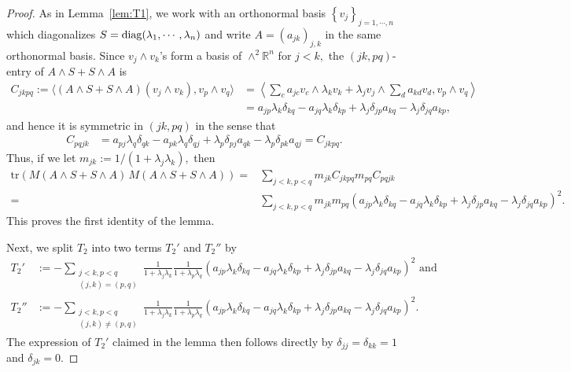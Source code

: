 \documentclass[11pt]{amsart}
\numberwithin{equation}{section}
\theoremstyle{definition}
\theoremstyle{definition}
\newcommand{\pair}[1]{\langle #1\rangle}
\newcommand{\set}[1]{\left\{#1\right\}}
\newcommand{\ppair}[1]{\left\langle #1\right\rangle}
\newcommand{\pr}[1]{\left(#1\right)}
\newcommand{\bb}[1]{\mathbb{#1}} \newcommand{\td}[1]{\widetilde{#1}}
\newcommand{\tr}{\text{tr}}
\begin{document}
\begin{proof}
	As in Lemma~\ref{lem:T1}, we work with an orthonormal basis $\set{v_j}_{j=1,\cdots,n}$ which diagonalizes $S={\rm diag}(\lambda_1,\cdots,\lambda_n)$ and write $A=(a_{jk})_{j,k}$ in the same orthonormal basis.
	Since $v_j\wedge v_k$'s form a basis of $\wedge^2\bb R^n$ for $j<k,$
	the $(jk,pq)$-entry of $A\wedge S+ S\wedge A$ is
	\begin{align*}
	C_{jkpq}
	:= \pair{(A\wedge S+ S\wedge A)(v_j\wedge v_k), v_p\wedge v_q}
	& = \ppair{
		\sum_c a_{jc}v_c\wedge \lambda_kv_k
		+ \lambda_jv_j\wedge \sum_d a_{kd}v_d,
		v_p\wedge v_q
	}\\
	& = a_{jp}\lambda_k\delta_{kq} - a_{jq}\lambda_k\delta_{kp}
	+ \lambda_j\delta_{jp}a_{kq}
	- \lambda_j\delta_{jq}a_{kp},
	\end{align*}
	and hence it is symmetric in $(jk,pq)$ in the sense that
	\begin{align*}
	C_{pqjk}
	& = a_{pj}\lambda_q\delta_{qk} - a_{pk}\lambda_q\delta_{qj}
	+ \lambda_p\delta_{pj}a_{qk}
	- \lambda_p\delta_{pk}a_{qj}
	= C_{jkpq}.
	\end{align*}
	Thus, if we let $m_{jk}:=1/(1+\lambda_j\lambda_k),$ then
	\begin{align*}
	\tr\pr{M (A \wedge S + S \wedge A) \, M (A \wedge S + S \wedge A) }
	= & \sum_{j<k, p<q}
	m_{jk} C_{jkpq} m_{pq} C_{pqjk}\\
	= & \sum_{j<k, p<q}
	m_{jk} m_{pq}
	\pr{a_{jp}\lambda_k\delta_{kq} - a_{jq}\lambda_k\delta_{kp}
		+ \lambda_j\delta_{jp}a_{kq}
		- \lambda_j\delta_{jq}a_{kp}}^2.
	\end{align*}
	This proves the first identity of the lemma.
	
	Next, we split $T_2$ into two terms $T_2'$ and $T_2''$ by
	\begin{align*}
	T_2'
	&:=- \sum_{\substack{j<k, p<q\\(j,k)= (p,q)}}
	\frac 1{1+\lambda_j\lambda_k}
	\frac 1{1+\lambda_p\lambda_q}
	\pr{a_{jp}\lambda_k\delta_{kq} - a_{jq}\lambda_k\delta_{kp}
		+ \lambda_j\delta_{jp}a_{kq}
		- \lambda_j\delta_{jq}a_{kp}}^2
	\text{ and}\\
	T_2''
	&:= -\sum_{\substack{j<k, p<q\\(j,k)\neq (p,q)}}
	\frac 1{1+\lambda_j\lambda_k}
	\frac 1{1+\lambda_p\lambda_q}
	\pr{a_{jp}\lambda_k\delta_{kq} - a_{jq}\lambda_k\delta_{kp}
		+ \lambda_j\delta_{jp}a_{kq}
		- \lambda_j\delta_{jq}a_{kp}}^2.
	\end{align*}
	The expression of $T_2'$ claimed in the lemma then follows directly by $\delta_{jj}=\delta_{kk}=1$ and $\delta_{jk}=0.$
	

\end{proof}
\end{document}
